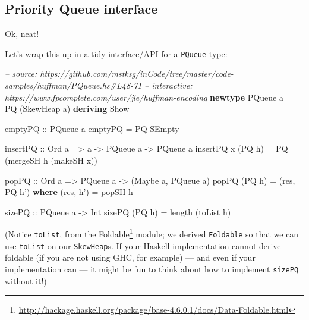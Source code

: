 \documentclass[]{article}
\newenvironment{Shaded}{}{}
\newcommand{\KeywordTok}[1]{\textcolor[rgb]{0.00,0.44,0.13}{\textbf{{#1}}}}
\newcommand{\DataTypeTok}[1]{\textcolor[rgb]{0.56,0.13,0.00}{{#1}}}
\newcommand{\CommentTok}[1]{\textcolor[rgb]{0.38,0.63,0.69}{\textit{{#1}}}}
\newcommand{\OtherTok}[1]{\textcolor[rgb]{0.00,0.44,0.13}{{#1}}}
\newcommand{\FunctionTok}[1]{\textcolor[rgb]{0.02,0.16,0.49}{{#1}}}
\newcommand{\NormalTok}[1]{{#1}}
\renewcommand{\href}[2]{#2\footnote{\url{#1}}}
\begin{document}
\subsection{Priority Queue interface}\label{priority-queue-interface}

Ok, neat!

Let's wrap this up in a tidy interface/API for a \texttt{PQueue} type:

\begin{Shaded}
\begin{Highlighting}[]
\CommentTok{-- source: https://github.com/mstksg/inCode/tree/master/code-samples/huffman/PQueue.hs#L48-71}
\CommentTok{-- interactive: https://www.fpcomplete.com/user/jle/huffman-encoding}
\KeywordTok{newtype} \DataTypeTok{PQueue} \NormalTok{a }\FunctionTok{=} \DataTypeTok{PQ} \NormalTok{(}\DataTypeTok{SkewHeap} \NormalTok{a) }\KeywordTok{deriving} \DataTypeTok{Show}

\OtherTok{emptyPQ ::} \DataTypeTok{PQueue} \NormalTok{a}
\NormalTok{emptyPQ }\FunctionTok{=} \DataTypeTok{PQ} \DataTypeTok{SEmpty}

\OtherTok{insertPQ ::} \DataTypeTok{Ord} \NormalTok{a }\OtherTok{=>} \NormalTok{a }\OtherTok{->} \DataTypeTok{PQueue} \NormalTok{a }\OtherTok{->} \DataTypeTok{PQueue} \NormalTok{a}
\NormalTok{insertPQ x (}\DataTypeTok{PQ} \NormalTok{h) }\FunctionTok{=} \DataTypeTok{PQ} \NormalTok{(mergeSH h (makeSH x))}

\OtherTok{popPQ ::} \DataTypeTok{Ord} \NormalTok{a }\OtherTok{=>} \DataTypeTok{PQueue} \NormalTok{a }\OtherTok{->} \NormalTok{(}\DataTypeTok{Maybe} \NormalTok{a, }\DataTypeTok{PQueue} \NormalTok{a)}
\NormalTok{popPQ (}\DataTypeTok{PQ} \NormalTok{h) }\FunctionTok{=} \NormalTok{(res, }\DataTypeTok{PQ} \NormalTok{h')}
  \KeywordTok{where}
    \NormalTok{(res, h') }\FunctionTok{=} \NormalTok{popSH h}

\OtherTok{sizePQ ::} \DataTypeTok{PQueue} \NormalTok{a }\OtherTok{->} \DataTypeTok{Int}
\NormalTok{sizePQ (}\DataTypeTok{PQ} \NormalTok{h) }\FunctionTok{=} \NormalTok{length (toList h)}
\end{Highlighting}
\end{Shaded}

(Notice \texttt{toList}, from the
\href{http://hackage.haskell.org/package/base-4.6.0.1/docs/Data-Foldable.html}{Foldable}
module; we derived \texttt{Foldable} so that we can use \texttt{toList}
on our \texttt{SkewHeap}s. If your Haskell implementation cannot derive
foldable (if you are not using GHC, for example) --- and even if your
implementation can --- it might be fun to think about how to implement
\texttt{sizePQ} without it!)
\end{document}
